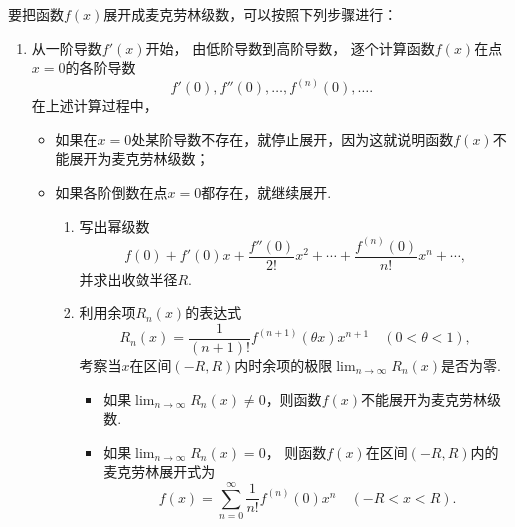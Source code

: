 要把函数\(f(x)\)展开成麦克劳林级数，可以按照下列步骤进行：
\begin{algorithm}[麦克劳林展开]\label{algorithm:函数项级数.麦克劳林展开}
\hfill
\begin{enumerate}
	\item 从一阶导数\(f'(x)\)开始，
	由低阶导数到高阶导数，
	逐个计算函数\(f(x)\)在点\(x=0\)的各阶导数\begin{equation*}
		f'(0),f''(0),\dotsc,f^{(n)}(0),\dotsc.
	\end{equation*}
	在上述计算过程中，
	\begin{itemize}
		\item 如果在\(x=0\)处某阶导数不存在，就停止展开，因为这就说明函数\(f(x)\)不能展开为麦克劳林级数；

		\item 如果各阶倒数在点\(x=0\)都存在，就继续展开.
		\begin{enumerate}
			\item 写出幂级数\begin{equation*}
				f(0) + f'(0) x + \frac{f''(0)}{2!} x^2 + \dotsb + \frac{f^{(n)}(0)}{n!} x^n + \dotsb,
			\end{equation*}
			并求出收敛半径\(R\).

			\item 利用余项\(R_n(x)\)的表达式\begin{equation*}
				R_n(x) = \frac{1}{(n+1)!} f^{(n+1)}(\theta x) x^{n+1}
				\quad(0 < \theta < 1),
			\end{equation*}
			考察当\(x\)在区间\((-R,R)\)内时余项的极限\(\lim_{n\to\infty} R_n(x)\)是否为零.
			\begin{itemize}
				\item 如果\(\lim_{n\to\infty} R_n(x) \neq 0\)，则函数\(f(x)\)不能展开为麦克劳林级数.

				\item 如果\(\lim_{n\to\infty} R_n(x) = 0\)，
				则函数\(f(x)\)在区间\((-R,R)\)内的麦克劳林展开式为\begin{equation*}
					f(x) = \sum_{n=0}^\infty \frac{1}{n!} f^{(n)}(0) x^n
					\quad(-R < x < R).
				\end{equation*}
			\end{itemize}
		\end{enumerate}
	\end{itemize}
\end{enumerate}
\end{algorithm}

